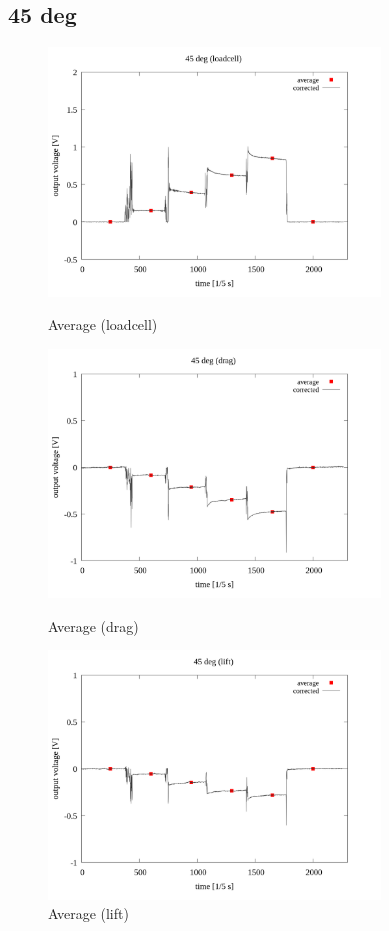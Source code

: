 \documentclass[twocolumn,a4j]{jsarticle}
\begin{document}
\newpage
\subsection{45 deg}
\begin{figure}[htbp]
    \footnotesize
    \begin{center}
        \includegraphics[width=88mm]{../images/average/45_loadcell_average.png}
        \caption{Average (loadcell)}
        \includegraphics[width=88mm]{../images/average/45_drag_average.png}
        \caption{Average (drag)}
        \includegraphics[width=88mm]{../images/average/45_lift_average.png}
        \caption{Average (lift)}
    \end{center}
\end{figure}
\end{document}
